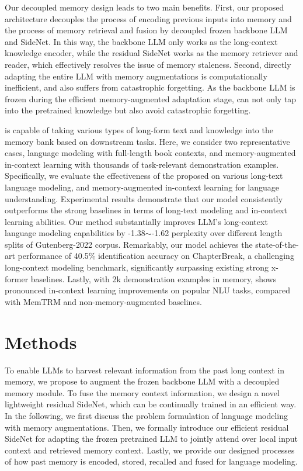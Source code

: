 Our decoupled memory design leads to two main benefits. First, our proposed architecture decouples the process of encoding previous inputs into memory and the process of memory retrieval and fusion by decoupled frozen backbone LLM and SideNet. In this way, the backbone LLM only works as the long-context knowledge encoder, while the residual SideNet works as the memory retriever and reader, which effectively resolves the issue of memory staleness. Second, directly adapting the entire LLM with memory augmentations is computationally inefficient, and also suffers from catastrophic forgetting. As the backbone LLM is frozen during the efficient memory-augmented adaptation stage, \our{} can not only tap into the pretrained knowledge but also avoid catastrophic forgetting. 

\our{} is capable of taking various types of long-form text and knowledge into the memory bank based on downstream tasks. Here, we consider two representative cases, language modeling with full-length book contexts, and memory-augmented in-context learning with thousands of task-relevant demonstration examples. Specifically, we evaluate the effectiveness of the proposed \our{} on various long-text language modeling, and memory-augmented in-context learning for language understanding. Experimental results demonstrate that our model consistently outperforms the strong baselines in terms of long-text modeling and in-context learning abilities. Our method substantially improves LLM's long-context language modeling capabilities by -1.38$\sim$-1.62 perplexity over different length splits of Gutenberg-2022 corpus. Remarkably, our model achieves the state-of-the-art performance of 40.5\% identification accuracy on ChapterBreak, a challenging long-context modeling benchmark, significantly surpassing existing strong x-former baselines. Lastly, with 2k demonstration examples in memory, \our{} 
 shows pronounced in-context learning improvements on popular NLU tasks, compared with MemTRM and non-memory-augmented baselines.

\section{Methods}
\label{sec:methods}

To enable LLMs to harvest relevant information from the past long context in memory, we propose to augment the frozen backbone LLM with a decoupled memory module. To fuse the memory context information, we design a novel lightweight residual SideNet, which can be continually trained in an efficient way. In the following, we first discuss the problem formulation of language modeling with memory augmentations. Then, we formally introduce our efficient residual SideNet for adapting the frozen pretrained LLM to jointly attend over local input context and retrieved memory context. Lastly, we provide our designed processes of how past memory is encoded, stored, recalled and fused for language modeling. 

